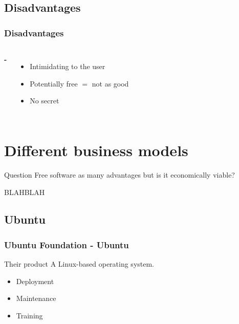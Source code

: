 \documentclass{beamer}
\begin{document}
\subsection{Disadvantages}

\begin{frame}

  \frametitle{Disadvantages}

  \begin{columns}

    \Huge{\textbf{-}}

    \begin{itemize}
      \item<2->{Intimidating to the user}
      \item<3->{Potentially free $=$ not as good}
      \item<4>{No secret}
    \end{itemize}

  \end{columns}

\end{frame}

\section{Different business models}

\begin{frame}

  \begin{block}{Question}
    Free software as many advantages but is it economically viable?
  \end{block}

  \vfill

  BLAHBLAH

\end{frame}

\subsection{Ubuntu}

\begin{frame}

  \frametitle{Ubuntu Foundation - Ubuntu}

  \begin{block}{Their product}
    A Linux-based operating system.
  \end{block}

  \vfill

  \begin{itemize}
    \item<2->{Deployment}
    \item<3->{Maintenance}
    \item<4>{Training}
  \end{itemize}

\end{frame}
\end{document}
